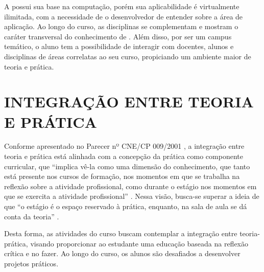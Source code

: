 A \nomedocurso possui sua base na computação, porém sua aplicabilidade é virtualmente ilimitada, com a necessidade de o desenvolvedor de \nomedocurso entender sobre a área de aplicação. Ao longo do curso, as disciplinas se complementam e mostram o caráter transversal do conhecimento de \nomedocurso.
Além disso, por ser um campus temático, o aluno tem a possibilidade de interagir com docentes, alunos e disciplinas de áreas correlatas ao seu curso, propiciando um ambiente maior de teoria e prática.

\section{INTEGRAÇÃO ENTRE TEORIA E PRÁTICA}

Conforme apresentado no Parecer nº CNE/CP 009/2001 , a integração entre teoria e prática está alinhada com a concepção da prática como componente curricular, que ``implica vê-la como uma dimensão do conhecimento, que tanto está presente nos cursos de formação, nos momentos em que se trabalha na reflexão sobre a atividade profissional, como durante o estágio nos momentos em que se exercita a atividade profissional'' \cite[p. 23]{cne2001parecer9}. Nessa visão, busca-se superar a ideia de que ``o estágio é o espaço reservado à prática, enquanto, na sala de aula se dá conta da teoria'' \cite[p. 23]{cne2001parecer9}. %

Desta forma, as atividades do curso buscam contemplar a integração entre teoria-prática, visando proporcionar ao estudante uma educação baseada na reflexão crítica e no fazer. Ao longo do curso, os alunos são desafiados a desenvolver projetos práticos. %

